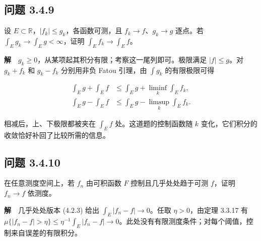 \documentclass[11pt,a4paper]{article}
\begin{document}
\subsection{问题 3.4.9}\label{ux95eeux9898-3.4.9}

设 \(E\subset\mathbb R\)，\(|f_k|\le g_k\)，各函数可测，且
\(f_k\to f\)、\(g_k\to g\) 逐点。若
\(\int_E g_k\to\int_Eg<\infty\)，证明 \(\int_E f_k\to\int_E f\)。

\textbf{解}　\(g_k\ge0\)，从某项起其积分有限；考察这一尾列即可。极限满足
\(|f|\le g\)。对 \(g_k+f_k\) 和 \(g_k-f_k\) 分别用非负 Fatou 引理，由
\(\int g_k\) 的有限极限可得

\begin{equation*}
\begin{aligned}
\int_Eg+\int_E f&\le\int_E g+\liminf_k\int_E f_k,\\
\int_Eg-\int_E f&\le\int_E g-\limsup_k\int_E f_k .
\end{aligned}
\end{equation*}

相减后，上、下极限都被夹在 \(\int_E f\) 处。这道题的控制函数随 \(k\)
变化，它们积分的收敛恰好补回了比较所需的信息。

\subsection{问题 3.4.10}\label{ux95eeux9898-3.4.10}

在任意测度空间上，若 \(f_n\) 由可积函数 \(F\) 控制且几乎处处趋于可测
\(f\)，证明 \(f_n\to f\) 依测度。

\textbf{解}　几乎处处版本 (4.2.3) 给出 \(\int_E|f_n-f|\to0\)。任取
\(\eta>0\)，由定理 3.3.17 有
\(\mu\{|f_n-f|>\eta\}\le\eta^{-1}\int_E|f_n-f|\to0\)。此处没有有限测度条件；对每个阈值，控制来自误差的有限积分。
\end{document}
